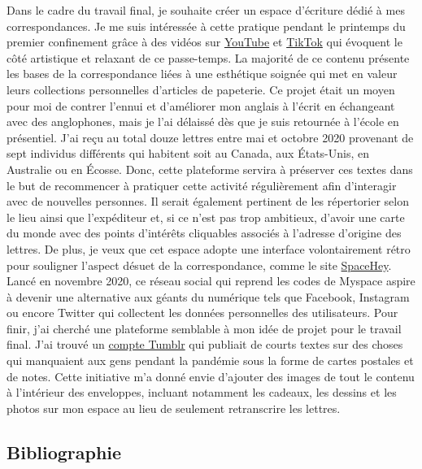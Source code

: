 \documentclass[12pt,french,letterpaper]{article}
\begin{document}
\normalsize{Dans le cadre du travail final, je souhaite créer un espace
d'écriture dédié à mes correspondances. Je me suis intéressée à cette
pratique pendant le printemps du premier confinement grâce à des vidéos
sur \href{https://www.youtube.com/watch?v=rIzuVqS3W7o}{YouTube} et
\href{https://www.tiktok.com/@ihearttgiraffes/video/7042062179218017582?is_from_webapp=1\&sender_device=pc\&web_id=7179212705482933766}{TikTok}
qui évoquent le côté artistique et relaxant de ce passe-temps. La
majorité de ce contenu présente les bases de la correspondance liées à
une esthétique soignée qui met en valeur leurs collections personnelles
d'articles de papeterie. Ce projet était un moyen pour moi de contrer
l'ennui et d'améliorer mon anglais à l'écrit en échangeant avec des
anglophones, mais je l'ai délaissé dès que je suis retournée à l'école
en présentiel. J'ai reçu au total douze lettres entre mai et octobre
2020 provenant de sept individus différents qui habitent soit au Canada,
aux États-Unis, en Australie ou en Écosse. Donc, cette plateforme
servira à préserver ces textes dans le but de recommencer à pratiquer
cette activité régulièrement afin d'interagir avec de nouvelles
personnes. Il serait également pertinent de les répertorier selon le
lieu ainsi que l'expéditeur et, si ce n'est pas trop ambitieux, d'avoir
une carte du monde avec des points d'intérêts cliquables associés à
l'adresse d'origine des lettres. De plus, je veux que cet espace adopte
une interface volontairement rétro pour souligner l'aspect désuet de la
correspondance, comme le site \href{https://spacehey.com/}{SpaceHey}.
Lancé en novembre 2020, ce réseau social qui reprend les codes de
Myspace aspire à devenir une alternative aux géants du numérique tels
que Facebook, Instagram ou encore Twitter qui collectent les données
personnelles des utilisateurs. Pour finir, j'ai cherché une plateforme
semblable à mon idée de projet pour le travail final. J'ai trouvé un
\href{https://wish-uwerehere.tumblr.com/}{compte Tumblr} qui publiait de
courts textes sur des choses qui manquaient aux gens pendant la pandémie
sous la forme de cartes postales et de notes. Cette initiative m'a donné
envie d'ajouter des images de tout le contenu à l'intérieur des
enveloppes, incluant notamment les cadeaux, les dessins et les photos
sur mon espace au lieu de seulement retranscrire les lettres.

\hypertarget{bibliographie}{%
\subsection{Bibliographie}\label{bibliographie}}}
\end{document}
